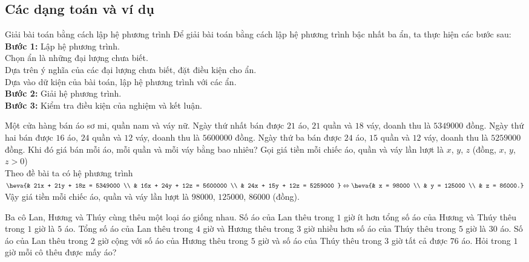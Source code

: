 \begin{bt}
\subsection{Các dạng toán và ví dụ}
\begin{dang}{Giải bài toán bằng cách lập hệ phương trình}
	Để giải bài toán bằng cách lập hệ phương trình bậc nhất ba ẩn, ta thực hiện các bước sau:\\
	\textbf{Bước 1: }Lập hệ phương trình.\\
	Chọn ẩn là những đại lượng chưa biết.\\
	Dựa trên ý nghĩa của các đại lượng chưa biết, đặt điều kiện cho ẩn.\\
	Dựa vào dữ kiện của bài toán, lập hệ phương trình với các ẩn.\\
	\textbf{Bước 2:} Giải hệ phương trình.\\
	\textbf{Bước 3: }Kiểm tra điều kiện của nghiệm và kết luận.
	\end{dang}
\begin{vd}%
	Một cửa hàng bán áo sơ mi, quần nam và váy nữ. Ngày thứ nhất bán được $21$ áo, $21$ quần và $18$ váy, doanh thu là $5349000$ đồng. Ngày thứ hai bán được $16$ áo, $24$ quần và $12$ váy, doanh thu là $5600000$ đồng. Ngày thứ ba bán được $24$ áo, $15$ quần và $12$ váy, doanh thu là $5259000$ đồng. Khi đó giá bán mỗi áo, mỗi quần và mỗi váy bằng bao nhiêu?	\loigiai
	{		Gọi giá tiền mỗi chiếc áo, quần và váy lần lượt là $x$, $y$, $z$ \big(đồng, $ x$, $y$, $z > 0$\big) \\
		Theo đề bài ta có hệ phương trình $ \heva{& 21x + 21y + 18z = 5349000 \\ & 16x + 24y + 12z = 5600000 \\ & 24x + 15y + 12z = 5259000 } \Leftrightarrow \heva{& x = 98000 \\ & y = 125000 \\ & z = 86000.} $ \\
		Vậy giá tiền mỗi chiếc áo, quần và váy lần lượt là $ 98000$, $125000$, $86000 $ \big(đồng\big).
	}
\end{vd}
\begin{vd}%
	Ba cô Lan, Hương và Thúy cùng thêu một loại áo giống nhau. Số áo của Lan thêu trong $1$ giờ ít hơn tổng số áo của Hương và Thúy thêu trong $1$ giờ là $5$ áo. Tổng số áo của Lan thêu trong $4$ giờ và Hương thêu trong $3$ giờ nhiều hơn số áo của Thúy thêu trong $5$ giờ là $30$ áo. Số áo của Lan thêu trong $2$ giờ cộng với số áo của Hương thêu trong $5$ giờ và số áo của Thúy thêu trong $3$ giờ tất cả được $76$ áo. Hỏi trong $1$ giờ mỗi cô thêu được mấy áo?

\end{vd}
\end{bt}
